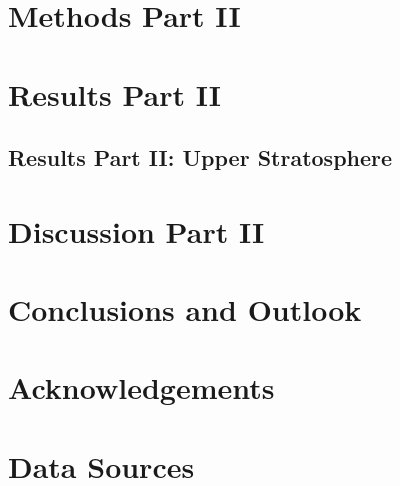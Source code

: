 \documentclass[12pt]{article}
\begin{document}
\section{Methods Part II}

\newpage

\section{Results Part II}


\subsection{Results Part II: Upper Stratosphere}\label{upperstrat}

\newpage 

\section{Discussion Part II}

\newpage

\section{Conclusions and Outlook}

\newpage

\section*{Acknowledgements}

\newpage

\printbibliography
{}

\section*{Data Sources}

\newpage
\appendix

\end{document}

